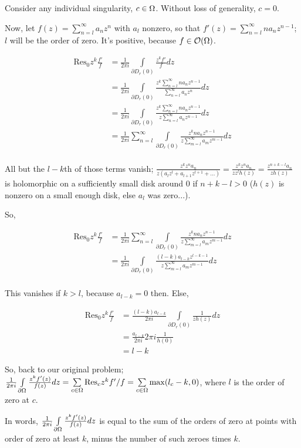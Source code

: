 \documentclass[a4paper,12pt]{article}
\begin{document}
Consider any individual singularity, $c \in \Omega$. Without loss of generality, $c=0$. %

Now, let $f(z) = \sum\limits_{n=l}^\infty a_nz^n$ with $a_l$ nonzero, so that $f'(z) = \sum\limits_{n=l}^\infty na_nz^{n-1}$; $l$ will be the order of zero. It's positive, because $f \in \mathcal{O}(\Omega)$.

\begin{align*} %
\text{Res}_0 z^k\frac{f'}{f}  &= \frac{1}{2\pi i} \int\limits_{ \partial D_r(0)} \frac{z^kf'}{f} dz\\
&= \frac{1}{2\pi i} \int\limits_{ \partial D_r(0)} \frac{z^k\sum\limits_{n=l}^\infty na_nz^{n-1}}{\sum\limits_{n=l}^\infty a_nz^n} dz\\
&= \frac{1}{2\pi i} \int\limits_{ \partial D_r(0)} \frac{z^k\sum\limits_{n=l}^\infty na_nz^{n-1}}{z\sum\limits_{n=l}^\infty a_{n}z^{n-1}} dz\\
&= \frac{1}{2\pi i} \sum\limits_{n=l}^\infty \int\limits_{ \partial D_r(0)} \frac{z^k na_nz^{n-1}}{z\sum\limits_{m=l}^\infty a_{m}z^{m-1}} dz\\
\end{align*} 

All but the $l-k$th of those terms vanish; $\frac{z^kz^na_n}{z(a_{l}z^{l}+ a_{l+1}z^{l+1}+ \ldots )} = \frac{z^kz^na_n}{zz^lh(z)} = \frac{z^{n+k-l}a_n}{zh(z)}$ is holomorphic on a sufficiently small disk around $0$ if $n +k-l > 0$ ($h(z)$ is nonzero on a small enough disk, else $a_l$ was zero...).

So, 

\begin{align*}
\text{Res}_0 z^k\frac{f'}{f} &= \frac{1}{2\pi i} \sum\limits_{n=l}^\infty \int\limits_{ \partial D_r(0)} \frac{z^kna_nz^{n-1}}{z\sum\limits_{m=l}^\infty a_{m}z^{m-1}} dz\\
&= \frac{1}{2\pi i} \int\limits_{ \partial D_r(0)} \frac{(l-k)a_{l-k}z^{l-k-1}}{z\sum\limits_{m=l}^\infty a_{m}z^{m-1}} dz\\
\end{align*}

This vanishes if $k >l$, because $a_{l-k} = 0$ then. Else,

\begin{align*}
\text{Res}_0 z^k\frac{f'}{f} &= \frac{(l-k)a_{l-k}}{2\pi i}  \int\limits_{ \partial D_r(0)} \frac{1}{zh(z)} dz\\
&= \frac{a_{l-k}}{2\pi i}  2 \pi i \frac{1}{h(0)}\\
&= l-k %
\end{align*}

So, back to our original problem; $\frac{1}{2\pi i} \int\limits_{\partial \Omega} \frac{z^k f'(z)}{f(z)} dz =\sum\limits_{c \in \Omega} \text{Res}_c z^k f'/f = \sum\limits_{c \in \Omega} \max(l_c-k,0)$, where $l$ is the order of zero at $c$.

In words, $\frac{1}{2\pi i} \int\limits_{\partial \Omega} \frac{z^k f'(z)}{f(z)} dz$ is equal to the sum of the orders of zero at points with order of zero at least $k$, minus the number of such zeroes times $k$.

\shunt
\end{document}
